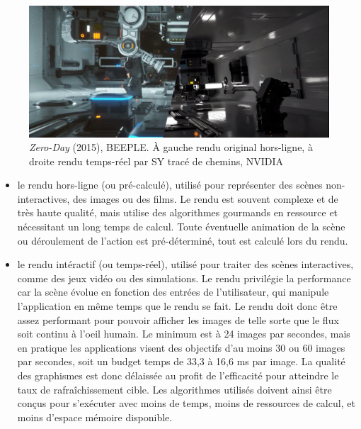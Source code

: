\bigskip

\begin{figure}[h]
    \centering
    \includegraphics[width=\textwidth]{contenu/resources/images/zero_day_comparison}
    \caption[{\it Zero-Day} (2015), BEEPLE]{{\it Zero-Day} (2015), BEEPLE. À gauche rendu original hors-ligne, à droite rendu temps-réel par SY tracé de chemins, NVIDIA~\cite{ZeroDay}}
    \label{fig:zero-day}
\end{figure}

\begin{itemize}
    \item le rendu hors-ligne (ou pré-calculé), utilisé pour représenter des scènes non-interactives, des images ou des films. Le rendu est souvent complexe et de très haute qualité, mais utilise des algorithmes gourmands en ressource et nécessitant un long temps de calcul. Toute éventuelle animation de la scène ou déroulement de l'action est pré-déterminé, tout est calculé lors du rendu.
    \item le rendu intéractif (ou temps-réel), utilisé pour traiter des scènes interactives, comme des jeux vidéo ou des simulations. Le rendu privilégie la performance car la scène évolue en fonction des entrées de l'utilisateur, qui manipule l'application en même temps que le rendu se fait. Le rendu doit donc être assez performant pour pouvoir afficher les images de telle sorte que le flux soit continu à l'oeil humain. Le minimum est à 24 images par secondes, mais en pratique les applications visent des objectifs d'au moins 30 ou 60 images par secondes, soit un budget temps de 33,3 à 16,6 ms par image. La qualité des graphismes est donc délaissée au profit de l'efficacité pour atteindre le taux de rafraîchissement cible. Les algorithmes utilisés doivent ainsi être conçus pour s'exécuter avec moins de temps, moins de ressources de calcul, et moins d'espace mémoire disponible.
\end{itemize}

